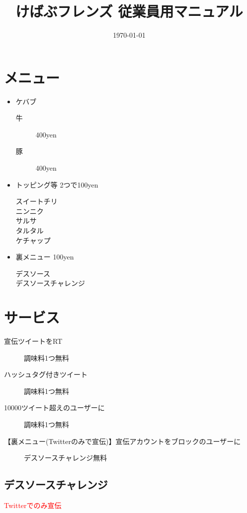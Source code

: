 \documentclass[10pt,a4paper]{jarticle}
\title{けばぶフレンズ 従業員用マニュアル}
\date{\today}
\begin{document}
  \maketitle
  \tableofcontents

  \section{メニュー}
\begin{itemize}
  \item ケバブ
  \begin{description}
    \item[牛] 400yen
    \item[豚] 400yen
  \end{description}
  \item トッピング等 2つで100yen
  \begin{description}
    \item[スイートチリ]
    \item[ニンニク]
    \item[サルサ]
    \item[タルタル]
    \item[ケチャップ]
  \end{description}
  \item 裏メニュー 100yen
  \begin{description}
    \item[デスソース]
    \item[デスソースチャレンジ]
  \end{description}
\end{itemize}

\section{サービス}
\begin{description}
  \item[宣伝ツイートをRT] 調味料1つ無料
  \item[ハッシュタグ付きツイート] 調味料1つ無料
  \item[10000ツイート超えのユーザーに] 調味料1つ無料
  \item[【裏メニュー(Twitterのみで宣伝)】宣伝アカウントをブロックのユーザーに] デスソースチャレンジ無料
\end{description}
\subsection{デスソースチャレンジ}
\textcolor{red}{Twitterでのみ宣伝}
\end{document}
